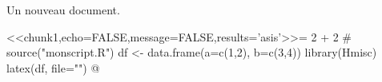 \documentclass{article}
\begin{document}
Un nouveau document.

<<chunk1,echo=FALSE,message=FALSE,results='asis'>>=
2 + 2 
# source("monscript.R")
df <- data.frame(a=c(1,2), b=c(3,4))
library(Hmisc)
latex(df, file="")
@
\end{document}
